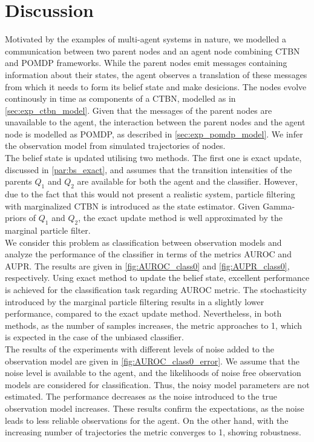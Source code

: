 \chapter{Discussion}
\label{chap:5}
Motivated by the examples of multi-agent systems in nature, we modelled a communication between two parent nodes and an agent node combining CTBN and POMDP frameworks. While the parent nodes emit messages containing information about their states, the agent observes a translation of these messages from which it needs to form its belief state and make desicions. The nodes evolve continously in time as components of a CTBN, modelled as in \cref{sec:exp_ctbn_model}. Given that the messages of the parent nodes are unavailable to the agent, the interaction between the parent nodes and the agent node is modelled as POMDP, as described in \cref{sec:exp_pomdp_model}. We infer the observation model from simulated trajectories of nodes. \\
The belief state is updated utilising two methods. The first one is exact update, discussed in \cref{par:bs_exact}, and assumes that the transition intensities of the parents $ Q_1 $ and $ Q_2 $ are available for both the agent and the classifier. However, due to the fact that this would not present a realistic system, particle filtering with marginalized CTBN is introduced as the state estimator. Given Gamma-priors of $ Q_1 $ and $ Q_2 $, the exact update method is well approximated by the marginal particle filter.\\
We consider this problem as classification between observation models and analyze the performance of the classifier in terms of the metrics AUROC and AUPR. The results are given in \autoref{fig:AUROC_class0} and \autoref{fig:AUPR_class0}, respectively. Using exact method to update the belief state, excellent performance is achieved for the classification task regarding AUROC metric. The stochasticity introduced by the marginal particle filtering results in a slightly lower performance, compared to the exact update method. Nevertheless, in both methods, as the number of samples increases, the metric approaches to 1, which is expected in the case of the unbiased classifier.\\
The results of the experiments with different levels of noise added to the observation model are given in \autoref{fig:AUROC_class0_error}. We assume that the noise level is available to the agent, and the likelihoods of noise free observation models are considered for classification. Thus, the noisy model parameters are not estimated. The performance decreases as the noise introduced to the true observation model increases. These results confirm the expectations, as the noise leads to less reliable observations for the agent. On the other hand, with the increasing number of trajectories the metric converges to 1, showing robustness.\\
